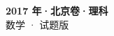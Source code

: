 \documentclass[zihao=-4, a4paper]{ctexart}
\begin{document}
\begin{center}
  {\Large\bfseries 2017 年·北京卷·理科}\\[4pt]
  {\large 数学 · 试题版}
\end{center}
\medskip
{}

\end{document}
